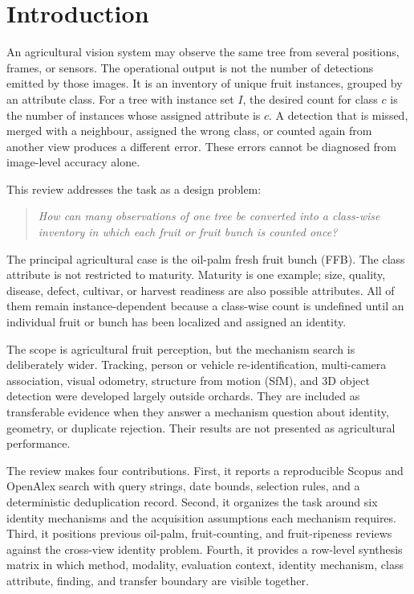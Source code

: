
\section{Introduction}
\label{sec:intro2}

An agricultural vision system may observe the same tree from several positions, frames, or sensors. The operational output is not the number of detections emitted by those images. It is an inventory of unique fruit instances, grouped by an attribute class. For a tree with instance set $I$, the desired count for class $c$ is the number of instances whose assigned attribute is $c$. A detection that is missed, merged with a neighbour, assigned the wrong class, or counted again from another view produces a different error. These errors cannot be diagnosed from image-level accuracy alone.

This review addresses the task as a design problem:
\begin{quote}
\emph{How can many observations of one tree be converted into a class-wise inventory in which each fruit or fruit bunch is counted once?}
\end{quote}
The principal agricultural case is the oil-palm fresh fruit bunch (FFB). The class attribute is not restricted to maturity. Maturity is one example; size, quality, disease, defect, cultivar, or harvest readiness are also possible attributes. All of them remain instance-dependent because a class-wise count is undefined until an individual fruit or bunch has been localized and assigned an identity.

The scope is agricultural fruit perception, but the mechanism search is deliberately wider. Tracking, person or vehicle re-identification, multi-camera association, visual odometry, structure from motion (SfM), and 3D object detection were developed largely outside orchards. They are included as transferable evidence when they answer a mechanism question about identity, geometry, or duplicate rejection. Their results are not presented as agricultural performance.

The review makes four contributions. First, it reports a reproducible Scopus and OpenAlex search with query strings, date bounds, selection rules, and a deterministic deduplication record. Second, it organizes the task around six identity mechanisms and the acquisition assumptions each mechanism requires. Third, it positions previous oil-palm, fruit-counting, and fruit-ripeness reviews against the cross-view identity problem. Fourth, it provides a row-level synthesis matrix in which method, modality, evaluation context, identity mechanism, class attribute, finding, and transfer boundary are visible together.

